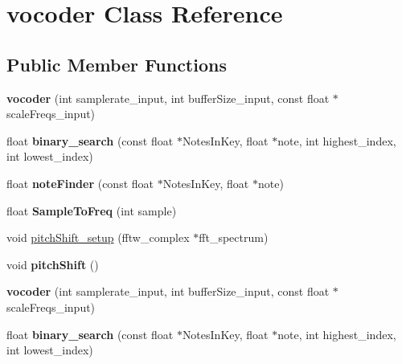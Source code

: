\hypertarget{classvocoder}{\section{vocoder Class Reference}
\label{classvocoder}
}
\subsection*{Public Member Functions}
\begin{DoxyCompactItemize}
\item 
\hypertarget{classvocoder_a5e51f2bff73fdb41cb326e0743170b15}{{\bfseries vocoder} (int samplerate\-\_\-input, int buffer\-Size\-\_\-input, const float $\ast$scale\-Freqs\-\_\-input)}\label{classvocoder_a5e51f2bff73fdb41cb326e0743170b15}

\item 
\hypertarget{classvocoder_a516a5e099509664b6b328a9d055adcd7}{float {\bfseries binary\-\_\-search} (const float $\ast$Notes\-In\-Key, float $\ast$note, int highest\-\_\-index, int lowest\-\_\-index)}\label{classvocoder_a516a5e099509664b6b328a9d055adcd7}

\item 
\hypertarget{classvocoder_ac1c52677bdf6c7233f667c3905539716}{float {\bfseries note\-Finder} (const float $\ast$Notes\-In\-Key, float $\ast$note)}\label{classvocoder_ac1c52677bdf6c7233f667c3905539716}

\item 
\hypertarget{classvocoder_a2b3a6e386d3a18f9366320e5743d33b1}{float {\bfseries Sample\-To\-Freq} (int sample)}\label{classvocoder_a2b3a6e386d3a18f9366320e5743d33b1}

\item 
void \hyperlink{classvocoder_aa3d122aee6d6ae77ac5b04572e924dc0}{pitch\-Shift\-\_\-setup} (fftw\-\_\-complex $\ast$fft\-\_\-spectrum)
\item 
\hypertarget{classvocoder_aa218678a51da7429066c32e59edd5057}{void {\bfseries pitch\-Shift} ()}\label{classvocoder_aa218678a51da7429066c32e59edd5057}

\item 
\hypertarget{classvocoder_a5e51f2bff73fdb41cb326e0743170b15}{{\bfseries vocoder} (int samplerate\-\_\-input, int buffer\-Size\-\_\-input, const float $\ast$scale\-Freqs\-\_\-input)}\label{classvocoder_a5e51f2bff73fdb41cb326e0743170b15}

\item 
\hypertarget{classvocoder_a7a0b1f788e03878de287d7f6163208a9}{float {\bfseries binary\-\_\-search} (const float $\ast$Notes\-In\-Key, float $\ast$note, int highest\-\_\-index, int lowest\-\_\-index)}\label{classvocoder_a7a0b1f788e03878de287d7f6163208a9}


\end{DoxyCompactItemize}
